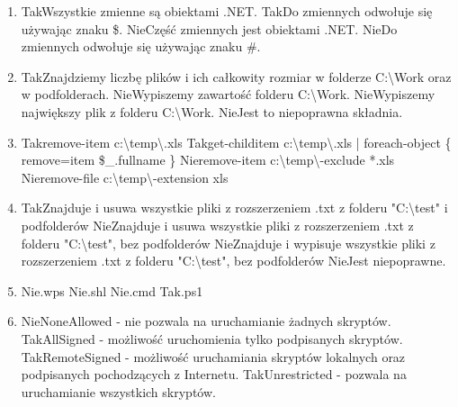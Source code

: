 \begin{enumerate}
		\newpage
		\item {}%
		{Tak}{Wszystkie zmienne są obiektami .NET.}%
		{Tak}{Do zmiennych odwołuje się używając znaku \$.}%
		{Nie}{Część zmiennych jest obiektami .NET.}%
		{Nie}{Do zmiennych odwołuje się używając znaku \#.}
		\item {}%
		{Tak}{Znajdziemy liczbę plików i ich całkowity rozmiar w folderze C:\textbackslash Work oraz w podfolderach.}%
		{Nie}{Wypiszemy zawartość folderu C:\textbackslash Work.}%
		{Nie}{Wypiszemy największy plik z folderu C:\textbackslash Work.}%
		{Nie}{Jest to niepoprawna składnia.}
		\item {}%
		{Tak}{remove-item c:\textbackslash temp\textbackslash *.xls}%
		{Tak}{get-childitem c:\textbackslash temp\textbackslash *.xls | foreach-object \{ remove=item \$\_.fullname \}}%
		{Nie}{remove-item c:\textbackslash temp\textbackslash * -exclude *.xls}%
		{Nie}{remove-file c:\textbackslash temp\textbackslash * -extension xls}
		\item {}%
		{Tak}{Znajduje i usuwa wszystkie pliki z rozszerzeniem .txt z folderu "C:\textbackslash test" i podfolderów}%
		{Nie}{Znajduje i usuwa wszystkie pliki z rozszerzeniem .txt z folderu "C:\textbackslash test", bez podfolderów}%
		{Nie}{Znajduje i wypisuje wszystkie pliki z rozszerzeniem .txt z folderu "C:\textbackslash test", bez podfolderów}%
		{Nie}{Jest niepoprawne.}
		\item {}%
		{Nie}{.wps}%
		{Nie}{.shl}%
		{Nie}{.cmd}%
		{Tak}{.ps1}
		\item {}%
		{Nie}{NoneAllowed - nie pozwala na uruchamianie żadnych skryptów.}%
		{Tak}{AllSigned - możliwość uruchomienia tylko podpisanych skryptów.}%
		{Tak}{RemoteSigned - możliwość uruchamiania skryptów lokalnych oraz podpisanych pochodzących z Internetu.}%
		{Tak}{Unrestricted - pozwala na uruchamianie wszystkich skryptów.}
		

\end{enumerate}
